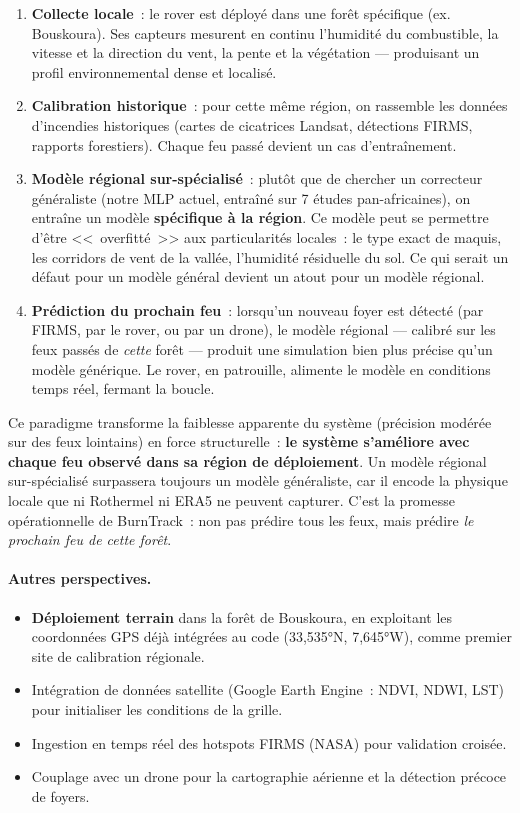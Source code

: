 \begin{enumerate}[nosep]
    \item \textbf{Collecte locale}~: le rover est déployé dans une forêt spécifique (ex. Bouskoura). Ses capteurs mesurent en continu l'humidité du combustible, la vitesse et la direction du vent, la pente et la végétation --- produisant un profil environnemental dense et localisé.
    \item \textbf{Calibration historique}~: pour cette même région, on rassemble les données d'incendies historiques (cartes de cicatrices Landsat, détections FIRMS, rapports forestiers). Chaque feu passé devient un cas d'entraînement.
    \item \textbf{Modèle régional sur-spécialisé}~: plutôt que de chercher un correcteur généraliste (notre MLP actuel, entraîné sur 7 études pan-africaines), on entraîne un modèle \textbf{spécifique à la région}. Ce modèle peut se permettre d'être <<~overfitté~>> aux particularités locales~: le type exact de maquis, les corridors de vent de la vallée, l'humidité résiduelle du sol. Ce qui serait un défaut pour un modèle général devient un atout pour un modèle régional.
    \item \textbf{Prédiction du prochain feu}~: lorsqu'un nouveau foyer est détecté (par FIRMS, par le rover, ou par un drone), le modèle régional --- calibré sur les feux passés de \textit{cette} forêt --- produit une simulation bien plus précise qu'un modèle générique. Le rover, en patrouille, alimente le modèle en conditions temps réel, fermant la boucle.
\end{enumerate}

Ce paradigme transforme la faiblesse apparente du système (précision modérée sur des feux lointains) en force structurelle~: \textbf{le système s'améliore avec chaque feu observé dans sa région de déploiement}. Un modèle régional sur-spécialisé surpassera toujours un modèle généraliste, car il encode la physique locale que ni Rothermel ni ERA5 ne peuvent capturer. C'est la promesse opérationnelle de BurnTrack~: non pas prédire tous les feux, mais prédire \textit{le prochain feu de cette forêt}.

\vspace{0.3cm}

\paragraph{Autres perspectives.}
\begin{itemize}[nosep]
    \item \textbf{Déploiement terrain} dans la forêt de Bouskoura, en exploitant les coordonnées GPS déjà intégrées au code (33,535°N, 7,645°W), comme premier site de calibration régionale.
    \item Intégration de données satellite (Google Earth Engine~: NDVI, NDWI, LST) pour initialiser les conditions de la grille.
    \item Ingestion en temps réel des hotspots FIRMS (NASA) pour validation croisée.
    \item Couplage avec un drone pour la cartographie aérienne et la détection précoce de foyers.
\end{itemize}

